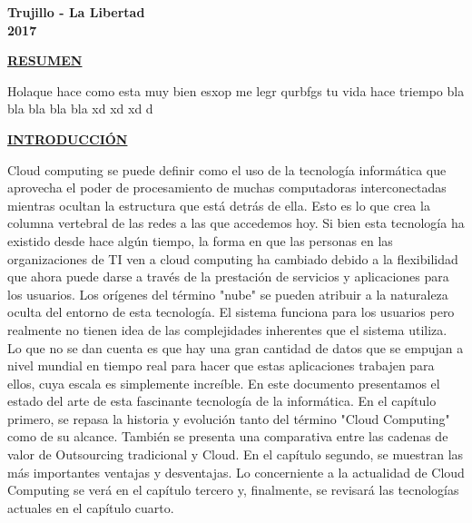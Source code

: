 \documentclass[a4paper, 12pt]{report}
\begin{document}
\vskip 3cm
\begin{center}    
	{\bf {\fontsize{14}{16.8}\selectfont Trujillo - La Libertad
	\\ 2017 }}
\end{center} 
\newpage
\pagestyle{plain}
\doublespacing
{}
\vspace*{6em}
\begin{center}
{\bf{\large{\underline{RESUMEN}}}}
\end{center}
\begin{justify}
Holaque hace como esta muy bien esxop me legr qurbfgs tu vida hace triempo bla bla bla bla bla xd xd xd d
\end{justify}
\newpage



\vspace*{6em}
\begin{center}
{\bf{\large{\underline{INTRODUCCI\'ON}}}}
\end{center}
\begin{justify}
Cloud computing se puede definir como el uso de la tecnología informática que aprovecha el poder de procesamiento de muchas computadoras interconectadas mientras ocultan la estructura que está detrás de ella.
Esto es lo que crea la columna vertebral de las redes a las que accedemos hoy. Si bien esta tecnología ha existido desde hace algún tiempo, la forma en que las personas en las organizaciones de TI ven a cloud computing ha cambiado debido a la flexibilidad que ahora puede darse a través de la prestación de servicios y aplicaciones para los usuarios.
Los orígenes del término "nube" se pueden atribuir a la naturaleza oculta del entorno de esta tecnología. El sistema funciona para los usuarios pero realmente no tienen idea de las complejidades inherentes que el sistema utiliza. Lo que no se dan cuenta es que hay una gran cantidad de datos que se empujan a nivel mundial en tiempo real para hacer que estas aplicaciones trabajen para ellos, cuya escala es simplemente increíble.
En este documento presentamos el estado del arte de esta fascinante tecnología de la informática. En el capítulo primero, se repasa la historia y evolución tanto del término "Cloud Computing" como de su alcance. También se presenta una comparativa entre las cadenas de valor de Outsourcing tradicional y Cloud. En el capítulo segundo, se muestran las más importantes ventajas y desventajas. Lo concerniente a la actualidad de Cloud Computing se verá en el capítulo tercero y, finalmente, se revisará las tecnologías actuales en el capítulo cuarto.
\end{justify}
\newpage
\end{document}
